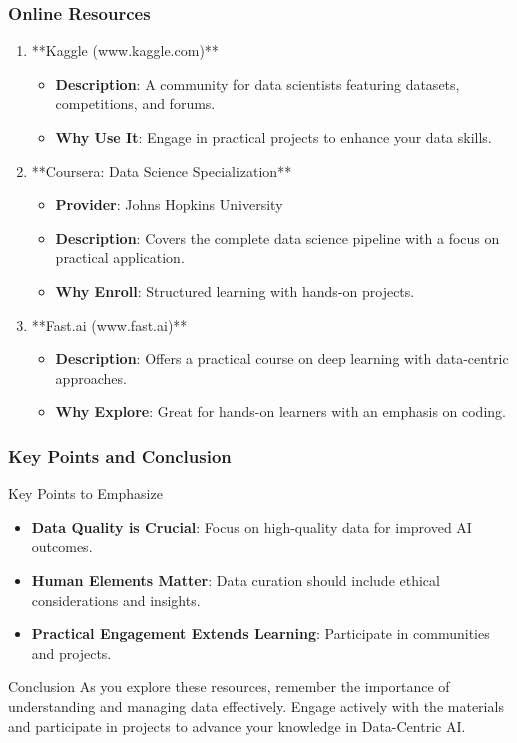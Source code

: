 \documentclass[aspectratio=169]{beamer}
\begin{document}
\begin{frame}[fragile]
    \frametitle{Online Resources}
    \begin{enumerate}
        \item **Kaggle (www.kaggle.com)**
            \begin{itemize}
                \item \textbf{Description}: A community for data scientists featuring datasets, competitions, and forums.
                \item \textbf{Why Use It}: Engage in practical projects to enhance your data skills.
            \end{itemize}
        \item **Coursera: Data Science Specialization**
            \begin{itemize}
                \item \textbf{Provider}: Johns Hopkins University
                \item \textbf{Description}: Covers the complete data science pipeline with a focus on practical application.
                \item \textbf{Why Enroll}: Structured learning with hands-on projects.
            \end{itemize}
        \item **Fast.ai (www.fast.ai)**
            \begin{itemize}
                \item \textbf{Description}: Offers a practical course on deep learning with data-centric approaches.
                \item \textbf{Why Explore}: Great for hands-on learners with an emphasis on coding.
            \end{itemize}
    \end{enumerate}
\end{frame}

\begin{frame}[fragile]
    \frametitle{Key Points and Conclusion}
    \begin{block}{Key Points to Emphasize}
        \begin{itemize}
            \item \textbf{Data Quality is Crucial}: Focus on high-quality data for improved AI outcomes.
            \item \textbf{Human Elements Matter}: Data curation should include ethical considerations and insights.
            \item \textbf{Practical Engagement Extends Learning}: Participate in communities and projects.
        \end{itemize}
    \end{block}
    \begin{block}{Conclusion}
        As you explore these resources, remember the importance of understanding and managing data effectively. Engage actively with the materials and participate in projects to advance your knowledge in Data-Centric AI.
    \end{block}
\end{frame}
\end{document}
